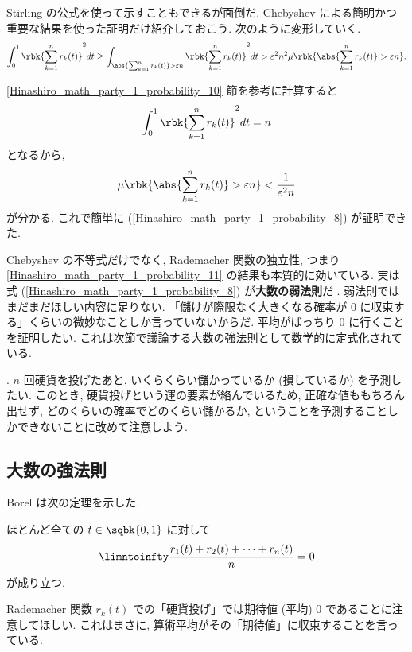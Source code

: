 \documentclass[openany, a4paper, oneside]{jsbook}
\begin{document}
{Stirling の公式を使って示すこともできるが面倒だ.
Chebyshev による簡明かつ重要な結果を使った証明だけ紹介しておこう.
次のように変形していく.
\begin{align}
 \int_0^1 \rbk{\sum_{k=1}^n r_k (t)}^2 dt
 \geq
 \int_{\abs{\sum_{k=1}^n r_k (t)} > \varepsilon n} \rbk{\sum_{k=1}^n r_k (t)}^2 dt
 >
 \varepsilon^2 n^2 \mu \rbk{\abs{\sum_{k=1}^n r_k (t)} > \varepsilon n}.
\end{align}

\ref{Hinashiro_math_party_1_probability_10} 節を参考に計算すると
\begin{align}
 \int_0^1 \rbk{\sum_{k=1}^n r_k (t)}^2 dt = n
\end{align}
となるから,
\begin{align}
 \mu \rbk{\abs{\sum_{k=1}^n r_k (t)} > \varepsilon n}
 <
 \frac{1}{\varepsilon^2 n}
\end{align}
が分かる.
これで簡単に (\ref{Hinashiro_math_party_1_probability_8}) が証明できた.

Chebyshev の不等式だけでなく, Rademacher 関数の独立性, つまり \ref{Hinashiro_math_party_1_probability_11} の結果も本質的に効いている.
実は式 (\ref{Hinashiro_math_party_1_probability_8}) が\textbf{大数の弱法則}だ \footnotemark.
弱法則ではまだまだほしい内容に足りない.
「儲けが際限なく大きくなる確率が 0 に収束する」くらいの微妙なことしか言っていないからだ.
平均がばっちり 0 に行くことを証明したい.
これは次節で議論する大数の強法則として数学的に定式化されている.}.
$n$ 回硬貨を投げたあと, いくらくらい儲かっているか (損しているか) を予測したい.
このとき, 硬貨投げという運の要素が絡んでいるため, 正確な値ももちろん出せず,
どのくらいの確率でどのくらい儲かるか, ということを予測することしかできないことに改めて注意しよう.
\subsection{大数の強法則}

Borel は次の定理を示した.
\begin{thm}[Borel]
 ほとんど全ての $t \in \sqbk{0, 1}$ に対して
 \begin{align}
  \limntoinfty \frac{r_1 (t) + r_2 (t) + \cdots + r_n (t)}{n} = 0
 \end{align}
 が成り立つ.
\end{thm}
Rademacher 関数 $r_k (t)$ での「硬貨投げ」では期待値 (平均) $0$ であることに注意してほしい.
これはまさに, 算術平均がその「期待値」に収束することを言っている.
\end{document}
